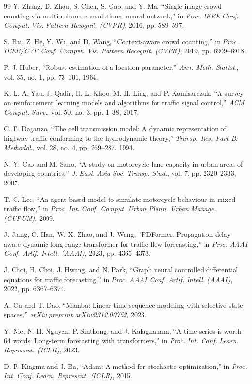 \documentclass[12pt,a4paper,oneside]{report}
\newcounter{algo}
\begin{document}
\begin{thebibliography}{99}
 Y. Zhang, D. Zhou, S. Chen, S. Gao, and Y. Ma, ``Single-image crowd counting via multi-column convolutional neural network,'' in \textit{Proc. IEEE Conf. Comput. Vis. Pattern Recognit. (CVPR)}, 2016, pp. 589--597.

 S. Bai, Z. He, Y. Wu, and D. Wang, ``Context-aware crowd counting,'' in \textit{Proc. IEEE/CVF Conf. Comput. Vis. Pattern Recognit. (CVPR)}, 2019, pp. 6909--6918.

 P. J. Huber, ``Robust estimation of a location parameter,'' \textit{Ann. Math. Statist.}, vol. 35, no. 1, pp. 73--101, 1964.

 K.-L. A. Yau, J. Qadir, H. L. Khoo, M. H. Ling, and P. Komisarczuk, ``A survey on reinforcement learning models and algorithms for traffic signal control,'' \textit{ACM Comput. Surv.}, vol. 50, no. 3, pp. 1--38, 2017.

 C. F. Daganzo, ``The cell transmission model: A dynamic representation of highway traffic conforming to the hydrodynamic theory,'' \textit{Transp. Res. Part B: Methodol.}, vol. 28, no. 4, pp. 269--287, 1994.

 N. Y. Cao and M. Sano, ``A study on motorcycle lane capacity in urban areas of developing countries,'' \textit{J. East. Asia Soc. Transp. Stud.}, vol. 7, pp. 2320--2333, 2007.

 T.-C. Lee, ``An agent-based model to simulate motorcycle behaviour in mixed traffic flow,'' in \textit{Proc. Int. Conf. Comput. Urban Plann. Urban Manage. (CUPUM)}, 2009.

 J. Jiang, C. Han, W. X. Zhao, and J. Wang, ``PDFormer: Propagation delay-aware dynamic long-range transformer for traffic flow forecasting,'' in \textit{Proc. AAAI Conf. Artif. Intell. (AAAI)}, 2023, pp. 4365--4373.

 J. Choi, H. Choi, J. Hwang, and N. Park, ``Graph neural controlled differential equations for traffic forecasting,'' in \textit{Proc. AAAI Conf. Artif. Intell. (AAAI)}, 2022, pp. 6367--6374.

 A. Gu and T. Dao, ``Mamba: Linear-time sequence modeling with selective state spaces,'' \textit{arXiv preprint arXiv:2312.00752}, 2023.

 Y. Nie, N. H. Nguyen, P. Sinthong, and J. Kalagnanam, ``A time series is worth 64 words: Long-term forecasting with transformers,'' in \textit{Proc. Int. Conf. Learn. Represent. (ICLR)}, 2023.

 D. P. Kingma and J. Ba, ``Adam: A method for stochastic optimization,'' in \textit{Proc. Int. Conf. Learn. Represent. (ICLR)}, 2015.

\end{thebibliography}
\end{document}
